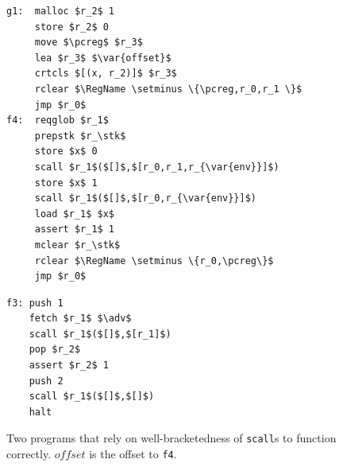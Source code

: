 \documentclass[compsoc,conference,letterpaper,fleqn]{IEEEtran}
\newcommand{\var}[1]{\mathit{#1}}
\newcommand{\pcreg}{\mathrm{pc}}
\newcommand{\adv}{\var{adv}}
\newcommand{\stk}{\var{stk}}
\newcommand{\plaindom}[1]{\mathrm{#1}}
\newcommand{\RegName}{\plaindom{RegName}}
\begin{document}

\begin{figure}[t]
  \centering
  \begin{minipage}[t]{5.05cm}
  \begin{lstlisting}
g1:  malloc $r_2$ 1
     store $r_2$ 0
     move $\pcreg$ $r_3$
     lea $r_3$ $\var{offset}$
     crtcls $[(x, r_2)]$ $r_3$
     rclear $\RegName \setminus \{\pcreg,r_0,r_1 \}$
     jmp $r_0$
f4:  reqglob $r_1$
     prepstk $r_\stk$
     store $x$ 0
     scall $r_1$($[]$,$[r_0,r_1,r_{\var{env}}]$)
     store $x$ 1
     scall $r_1$($[]$,$[r_0,r_{\var{env}}]$)
     load $r_1$ $x$
     assert $r_1$ 1
     mclear $r_\stk$
     rclear $\RegName \setminus \{r_0,\pcreg\}$
     jmp $r_0$
\end{lstlisting}
  \end{minipage}
  \begin{minipage}[t]{3.4cm}
  \begin{lstlisting}
f3: push 1
    fetch $r_1$ $\adv$
    scall $r_1$($[]$,$[r_1]$)
    pop $r_2$
    assert $r_2$ 1
    push 2
    scall $r_1$($[]$,$[]$)
    halt
\end{lstlisting}
  \end{minipage}
  \caption{ Two programs that rely on well-bracketedness of
    \texttt{scall}s to function correctly. $\var{offset}$ is the
    offset to \texttt{f4}.}
  \label{fig:prog-f3-and-g1}
\end{figure}
\end{document}
